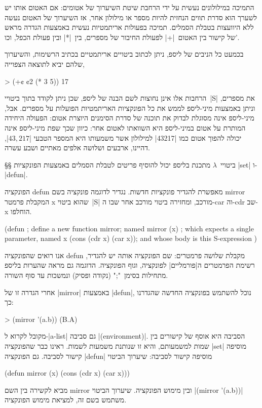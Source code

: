 התמיכה במילולונים נעשית על ידי הרחבת שיטת השיערוך של אטומים: אם האטום אותו יש
לשערך הוא סדרת תווים הנחזית להיות מספר או מילולון אחר, אז השיערוך של האטום נעשה
ללא היוועצות בטבלת הסמלים. תמיכה בפעולות אריתמטיות נעשית באמצעות הגדרה מראש של
קישור בין האטום~\T|+| לפעולת החיבור של מספרים, בין~\T|*| ובין פעולת הכפל,
וכו'.

בכמעט כל הניבים של ליספ, ניתן לכתוב ביטויים אריתמטיים בכתיב הרשימות, והשיערוך
שלהם יביא לתוצאה הצפוייה,

\begin{LISP}
> (+¢ ¢2 (* 3 5))
17
\end{LISP}

הרחבות אלו אינן נחוצות לשם הבנה של ליספ, שכן ניתן לקודד בתוך ביטויי~\E|S| את
מספרים, וניתן באמצעות מיני-ליספ לממש את כל הפונקציות האריתמטיות הפועלות על
מספרים. אבל, מיני-ליספ אינה מסוגלת לבדוק את תוכנה של סדרת הסימנים היוצרת אטום:
הפעולה היחידה המותרת על אטום במיני-ליספ היא השוואתו לאטום אחר: כיוון שכך שפת
מיני-ליספ אינה יכולה להפוך אטום כמו \T|43217| למילולון אשר משמעותו היא המספר
הטבעי \E|$43,217$|, דהיינו, ארבעים ושלושה אלפים מאתיים ושבע עשרה.

§§ ביטויי~$λ$
מתכנת בליספ יכול להוסיף פריטים לטבלת הסמלים באמצעות הפונקציות \E|set|
ו-\E|defun|.

הפונקציה defun מאפשרת להגדיר פונקציות חדשות. נגדיר לדוגמה פונקציה בשם mirror
המקבלת פרמטר x שהוא ביטוי~\E|S| מורכב, ומחזירה ביטוי מורכב אחר שבו ה-car וה-cdr
שב-x הוחלפו.
\begin{LISP}
(defun ; define a new function
  mirror; named mirror
  (x) ; which expects a single parameter, named x
  (cons (cdr x) (car x)); and whose body is this S-expression
)
\end{LISP}
אנו רואים שהפונקציה defun מקבלת שלושה פרמטרים: שם הפונקציה אותה יש להגדיר,
רשימת הפרמטרים ה\ע|פורמליים| לפונקציה, וגוף הפונקציה. הדוגמה גם מראה שהערות
בליספ מתחילות בסימן~";" (נקודה ופסיק) ונמשכות עד סוף השורה.

אחרי הגדרה זו של \E|mirror| באמצעות \E|defun|, נוכל להשתמש בפונקציה החדשה
שהגדרנו כך:
\begin{LISP}
> (mirror '(a.b))
(B.A)
\end{LISP}

מקובל לקרוא ל-\E|a-list| גם סביבה \E|(environment)|. הסביבה היא אוסף של קישורים
בין שמות למשמעותם, והיא זו שנותנת משמעות לשמות. ראינו כבר שהפונקציה \E|set|
מוסיפה קישור לסביבה. גם הפונקציה \E|defun| מוסיפה קישור לסביבה: שיערוך הביטוי
\begin{LISP}
(defun mirror (x) (cons (cdr x) (car x)))
\end{LISP}
מביא לקשירה בין השם mirror ובין מימוש הפונקציה. שיערוך הביטוי \T|(mirror
'(a.b))| משתמש בשם זה, למציאת מימוש הפונקציה.


